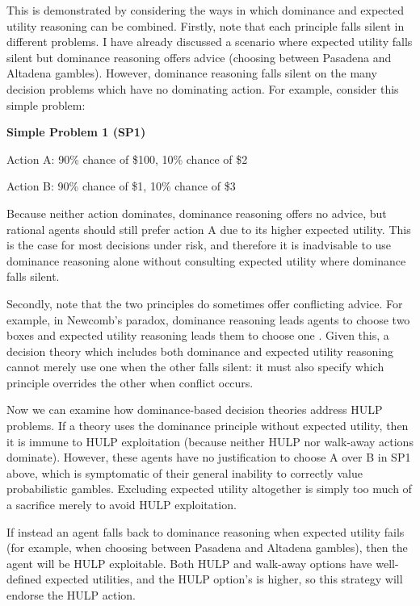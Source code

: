 \documentclass{article}
\begin{document}
This is demonstrated by considering the ways in which dominance and expected utility reasoning can be combined. Firstly, note that each principle falls silent in different problems. I have already discussed a scenario where expected utility falls silent but dominance reasoning offers advice (choosing between Pasadena and Altadena gambles). However, dominance reasoning falls silent on the many decision problems which have no dominating action. For example, consider this simple problem:

\begin{center}
\textbf{Simple Problem 1 (SP1)}

Action A: 90\% chance of \$100, 10\% chance of \$2

Action B: 90\% chance of \$1, 10\% chance of \$3
\end{center}

Because neither action dominates, dominance reasoning offers no advice, but rational agents should still prefer action A due to its higher expected utility. This is the case for most decisions under risk, and therefore it is inadvisable to use dominance reasoning alone without consulting expected utility where dominance falls silent.

Secondly, note that the two principles do sometimes offer conflicting advice. For example, in Newcomb's paradox, dominance reasoning leads agents to choose two boxes and expected utility reasoning leads them to choose one \citep[pg. 110]{resnik1987choices}. Given this, a decision theory which includes both dominance and expected utility reasoning cannot merely use one when the other falls silent: it must also specify which principle overrides the other when conflict occurs.

Now we can examine how dominance-based decision theories address HULP problems. If a theory uses the dominance principle without expected utility, then it is immune to HULP exploitation (because neither HULP nor walk-away actions dominate). However, these agents have no justification to choose A over B in SP1 above, which is symptomatic of their general inability to correctly value probabilistic gambles. Excluding expected utility altogether is simply too much of a sacrifice merely to avoid HULP exploitation.

If instead an agent falls back to dominance reasoning when expected utility fails (for example, when choosing between Pasadena and Altadena gambles), then the agent will be HULP exploitable. Both HULP and walk-away options have well-defined expected utilities, and the HULP option's is higher, so this strategy will endorse the HULP action.
\end{document}
